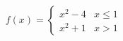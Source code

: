 \documentclass[preview]{standalone}
\begin{document}
\begin{align*}
f(x)=\begin{cases}x^2-4 & x \leq 1\\x^2 +1 & x>1\end{cases}
\end{align*}
\end{document}
